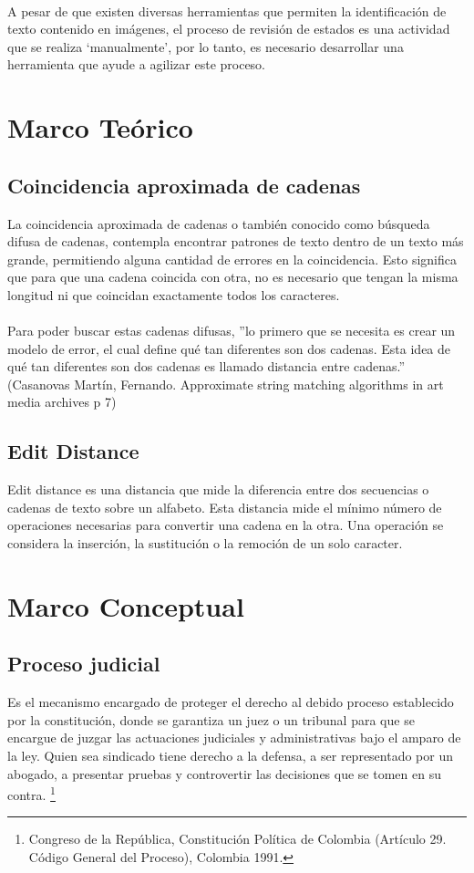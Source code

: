\paragraph{}
A pesar de que existen diversas herramientas que permiten la identificaci\'on
de texto contenido en im\'agenes, el proceso de revisi\'on de estados es 
una actividad que se realiza ‘manualmente’, por lo tanto, es necesario 
desarrollar una herramienta que ayude a agilizar este proceso.

\section{Marco Te\'orico}
\subsection{Coincidencia aproximada de cadenas}
La coincidencia aproximada de cadenas o tambi\'en conocido como b\'usqueda 
difusa de cadenas, contempla encontrar patrones de texto dentro de un 
texto m\'as grande, permitiendo alguna cantidad de errores en la coincidencia.
Esto significa que para que una cadena coincida con otra, no es necesario
que tengan la misma longitud ni que coincidan exactamente todos los 
caracteres.
\paragraph{}
Para poder buscar estas cadenas difusas, 
''lo primero que se necesita es crear un modelo de error, el cual define qu\'e tan diferentes son dos cadenas. Esta idea de qu\'e tan diferentes son dos cadenas es llamado distancia entre cadenas.'' (Casanovas Mart\'in, Fernando. Approximate string matching algorithms in art media archives p 7)

\subsection{Edit Distance}
Edit distance es una distancia que mide la diferencia entre dos 
secuencias o cadenas de texto sobre un alfabeto. Esta distancia mide el
m\'inimo n\'umero de operaciones necesarias para convertir una cadena en la
otra. Una operaci\'on se considera la inserci\'on, la sustituci\'on o la 
remoci\'on de un solo caracter.

\section{Marco Conceptual}
\subsection{Proceso judicial}
Es el mecanismo encargado de proteger el derecho al debido proceso 
establecido por la constituci\'on, donde se garantiza un juez o un 
tribunal para que se encargue de juzgar las actuaciones judiciales y 
administrativas bajo el amparo de la ley. Quien sea sindicado tiene 
derecho a la defensa, a ser representado por un abogado, a presentar 
pruebas y controvertir las decisiones que se tomen en su contra.
\footnote{Congreso de la Rep\'ublica, Constituci\'on Pol\'itica de Colombia (Artículo 29. C\'odigo General del Proceso), Colombia 1991.}



